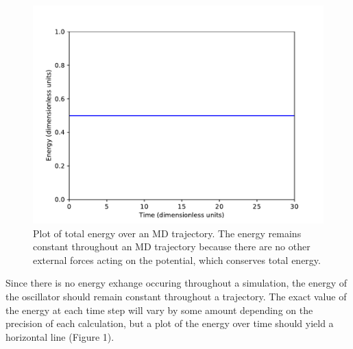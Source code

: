 \documentclass{article}
\begin{document}
\begin{figure}[H]
  \centering
  \includegraphics[scale=0.7]{Figures/1dverlet/energies.pdf}
    \caption{Plot of total energy over an MD trajectory. The energy remains constant throughout an MD trajectory because there are no other external forces acting on the potential, which conserves total energy.}
\end{figure}

Since there is no energy exhange occuring throughout a simulation, the energy of the oscillator should remain constant throughout a trajectory. The exact value of the energy at each time step will vary by some amount depending on the precision of each calculation, but a plot of the energy over time should yield a horizontal line (Figure 1).
\end{document}

